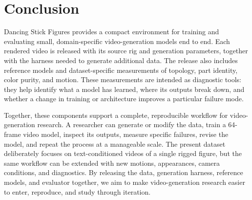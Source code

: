 \documentclass[10pt,twocolumn,letterpaper]{article}
\begin{document}
\section{Conclusion}
Dancing Stick Figures provides a compact environment for training and evaluating small, domain-specific video-generation models end to end.
Each rendered video is released with its source rig and generation parameters, together with the harness
needed to generate additional data. The release also includes reference models and dataset-specific
measurements of topology, part identity, color purity, and motion. These measurements are intended as
diagnostic tools: they help identify what a model has learned, where its outputs break down, and whether a
change in training or architecture improves a particular failure mode.

Together, these components support a complete, reproducible workflow for video-generation research. A
researcher can generate or modify the data, train a 64-frame video model, inspect its outputs, measure
specific failures, revise the model, and repeat the process at a manageable scale. The present dataset
deliberately focuses on text-conditioned videos of a single rigged figure, but the same workflow can be
extended with new motions, appearances, camera conditions, and diagnostics. By releasing the data,
generation harness, reference models, and evaluator together, we aim to make video-generation research
easier to enter, reproduce, and study through iteration.
\end{document}
